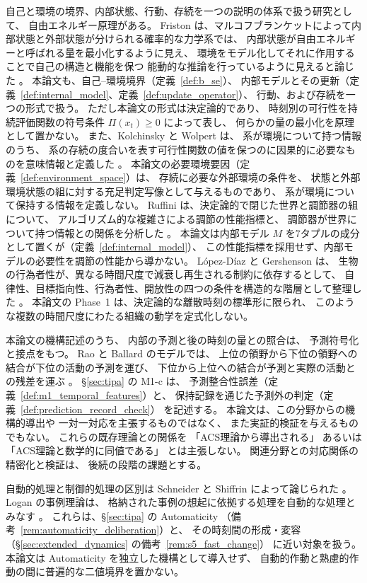 自己と環境の境界、内部状態、行動、存続を一つの説明の体系で扱う研究として、
自由エネルギー原理がある。
Friston は、マルコフブランケットによって内部状態と外部状態が分けられる確率的な力学系では、
内部状態が自由エネルギーと呼ばれる量を最小化するように見え、
環境をモデル化してそれに作用することで自己の構造と機能を保つ
能動的な推論を行っているように見えると論じた
\cite{Friston2013}。
本論文も、自己--環境境界（定義~\ref{def:b_se}）、
内部モデルとその更新（定義~\ref{def:internal_model}、定義~\ref{def:update_operator}）、
行動、および存続を一つの形式で扱う。
ただし本論文の形式は決定論的であり、
時刻別の可行性を持続評価関数の符号条件 $\Pi(x_t)\ge0$ によって表し、
何らかの量の最小化を原理として置かない。
また、Kolchinsky と Wolpert は、
系が環境について持つ情報のうち、
系の存続の度合いを表す可行性関数の値を保つのに因果的に必要なものを意味情報と定義した
\cite{KolchinskyWolpert2018}。
本論文の必要環境要因（定義~\ref{def:environment_space}）は、
存続に必要な外部環境の条件を、
状態と外部環境状態の組に対する充足判定写像として与えるものであり、
系が環境について保持する情報を定義しない。
Ruffini は、決定論的で閉じた世界と調節器の組について、
アルゴリズム的な複雑さによる調節の性能指標と、
調節器が世界について持つ情報との関係を分析した
\cite{Ruffini2026}。
本論文は内部モデル $M$ を7タプルの成分として置くが（定義~\ref{def:internal_model}）、
この性能指標を採用せず、内部モデルの必要性を調節の性能から導かない。
López-Díaz と Gershenson は、
生物の行為者性が、異なる時間尺度で減衰し再生される制約に依存するとして、
自律性、目標指向性、行為者性、開放性の四つの条件を構造的な階層として整理した
\cite{LopezDiazGershenson2026}。
本論文の Phase~1 は、決定論的な離散時刻の標準形に限られ、
このような複数の時間尺度にわたる組織の動学を定式化しない。

本論文の機構記述のうち、
内部の予測と後の時刻の量との照合は、
予測符号化と接点をもつ。
Rao と Ballard のモデルでは、
上位の領野から下位の領野への結合が下位の活動の予測を運び、
下位から上位への結合が予測と実際の活動との残差を運ぶ
\cite{RaoBallard1999}。
\S\ref{sec:tipa} の M1-c は、
予測整合性誤差（定義~\ref{def:m1_temporal_features}）と、
保持記録を通じた予測外の判定（定義~\ref{def:prediction_record_check}）
を記述する。
本論文は、この分野からの機構的導出や
一対一対応を主張するものではなく、
また実証的検証を与えるものでもない。
これらの既存理論との関係を
「ACS理論から導出される」
あるいは
「ACS理論と数学的に同値である」
とは主張しない。
関連分野との対応関係の精密化と検証は、
後続の段階の課題とする。

自動的処理と制御的処理の区別は
Schneider と Shiffrin によって論じられた
\cite{SchneiderShiffrin1977}。
Logan の事例理論は、
格納された事例の想起に依拠する処理を自動的な処理とみなす
\cite{Logan1988}。
これらは、\S\ref{sec:tipa} の Automaticity
（備考~\ref{rem:automaticity_deliberation}）と、
その時刻間の形成・変容
（\S\ref{sec:extended_dynamics} の備考~\ref{rem:s5_fast_change}）
に近い対象を扱う。
本論文は Automaticity を独立した機構として導入せず、
自動的作動と熟慮的作動の間に普遍的な二値境界を置かない。

